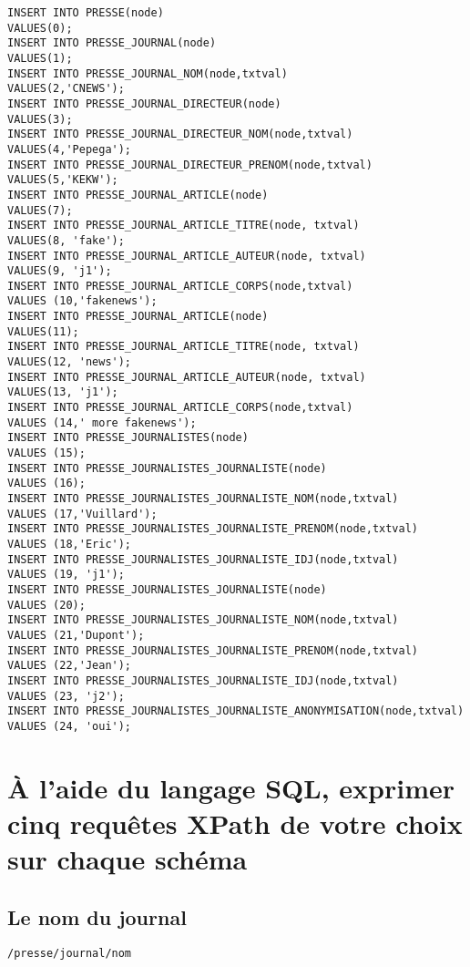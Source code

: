 \begin{verbatim}
INSERT INTO PRESSE(node)                                               VALUES(0);
INSERT INTO PRESSE_JOURNAL(node)                                       VALUES(1);
INSERT INTO PRESSE_JOURNAL_NOM(node,txtval)                            VALUES(2,'CNEWS');
INSERT INTO PRESSE_JOURNAL_DIRECTEUR(node)                             VALUES(3);
INSERT INTO PRESSE_JOURNAL_DIRECTEUR_NOM(node,txtval)                  VALUES(4,'Pepega');
INSERT INTO PRESSE_JOURNAL_DIRECTEUR_PRENOM(node,txtval)               VALUES(5,'KEKW');
INSERT INTO PRESSE_JOURNAL_ARTICLE(node)                               VALUES(7);
INSERT INTO PRESSE_JOURNAL_ARTICLE_TITRE(node, txtval)                 VALUES(8, 'fake');
INSERT INTO PRESSE_JOURNAL_ARTICLE_AUTEUR(node, txtval)                VALUES(9, 'j1');
INSERT INTO PRESSE_JOURNAL_ARTICLE_CORPS(node,txtval)                  VALUES (10,'fakenews');
INSERT INTO PRESSE_JOURNAL_ARTICLE(node)                               VALUES(11);
INSERT INTO PRESSE_JOURNAL_ARTICLE_TITRE(node, txtval)                 VALUES(12, 'news');
INSERT INTO PRESSE_JOURNAL_ARTICLE_AUTEUR(node, txtval)                VALUES(13, 'j1');
INSERT INTO PRESSE_JOURNAL_ARTICLE_CORPS(node,txtval)                  VALUES (14,' more fakenews');
INSERT INTO PRESSE_JOURNALISTES(node)                                  VALUES (15);
INSERT INTO PRESSE_JOURNALISTES_JOURNALISTE(node)                      VALUES (16);
INSERT INTO PRESSE_JOURNALISTES_JOURNALISTE_NOM(node,txtval)           VALUES (17,'Vuillard');
INSERT INTO PRESSE_JOURNALISTES_JOURNALISTE_PRENOM(node,txtval)        VALUES (18,'Eric');
INSERT INTO PRESSE_JOURNALISTES_JOURNALISTE_IDJ(node,txtval)           VALUES (19, 'j1');
INSERT INTO PRESSE_JOURNALISTES_JOURNALISTE(node)                      VALUES (20);
INSERT INTO PRESSE_JOURNALISTES_JOURNALISTE_NOM(node,txtval)           VALUES (21,'Dupont');
INSERT INTO PRESSE_JOURNALISTES_JOURNALISTE_PRENOM(node,txtval)        VALUES (22,'Jean');
INSERT INTO PRESSE_JOURNALISTES_JOURNALISTE_IDJ(node,txtval)           VALUES (23, 'j2');
INSERT INTO PRESSE_JOURNALISTES_JOURNALISTE_ANONYMISATION(node,txtval) VALUES (24, 'oui');
\end{verbatim}

\section{À l’aide du langage SQL, exprimer cinq requêtes XPath de votre choix sur chaque schéma}
\subsection {Le nom du journal}
\begin{verbatim}
/presse/journal/nom
\end{verbatim}

